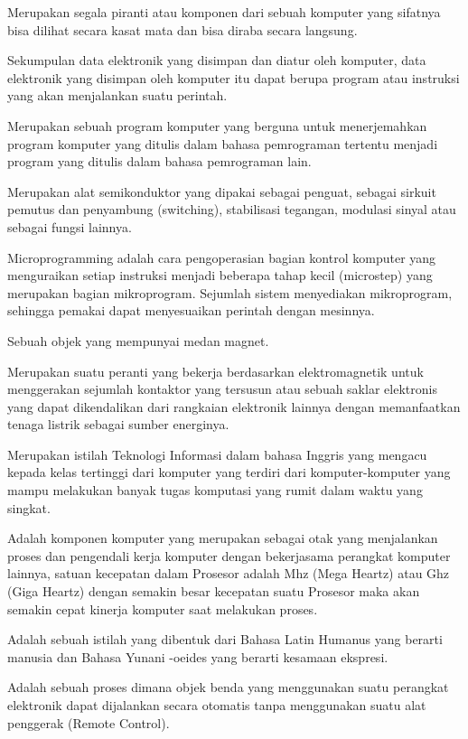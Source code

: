 
Merupakan segala piranti atau komponen dari sebuah komputer yang sifatnya bisa dilihat secara kasat mata dan bisa diraba secara langsung. 

Sekumpulan data elektronik yang disimpan dan diatur oleh komputer, data elektronik yang disimpan oleh komputer itu dapat berupa program atau instruksi yang akan menjalankan suatu perintah.

Merupakan sebuah program komputer yang berguna untuk menerjemahkan program komputer yang ditulis dalam bahasa pemrograman tertentu menjadi program yang ditulis dalam bahasa pemrograman lain.

Merupakan alat semikonduktor yang dipakai sebagai penguat, sebagai sirkuit pemutus dan penyambung (switching), stabilisasi tegangan, modulasi sinyal atau sebagai fungsi lainnya.

Microprogramming adalah cara pengoperasian bagian kontrol komputer yang menguraikan setiap instruksi menjadi beberapa tahap kecil (microstep) yang merupakan bagian mikroprogram. Sejumlah sistem menyediakan mikroprogram, sehingga pemakai dapat menyesuaikan perintah dengan mesinnya.

Sebuah objek yang mempunyai medan magnet.

Merupakan suatu peranti yang bekerja berdasarkan elektromagnetik untuk menggerakan sejumlah kontaktor yang tersusun atau sebuah saklar elektronis yang dapat dikendalikan dari rangkaian elektronik lainnya dengan memanfaatkan tenaga listrik sebagai sumber energinya.

Merupakan istilah Teknologi Informasi dalam bahasa Inggris yang mengacu kepada kelas tertinggi dari komputer yang terdiri dari komputer-komputer yang mampu melakukan banyak tugas komputasi yang rumit dalam waktu yang singkat.

Adalah komponen komputer yang merupakan sebagai otak yang menjalankan proses dan pengendali kerja komputer dengan bekerjasama perangkat komputer lainnya, satuan kecepatan dalam Prosesor adalah Mhz (Mega Heartz) atau Ghz (Giga Heartz) dengan semakin besar kecepatan suatu Prosesor maka akan semakin cepat kinerja komputer saat melakukan proses.

Adalah sebuah istilah yang dibentuk dari Bahasa Latin Humanus yang berarti manusia dan Bahasa Yunani -oeides yang berarti kesamaan ekspresi.

Adalah sebuah proses dimana objek benda yang menggunakan suatu
perangkat elektronik dapat dijalankan secara otomatis tanpa menggunakan suatu alat penggerak
(Remote Control).